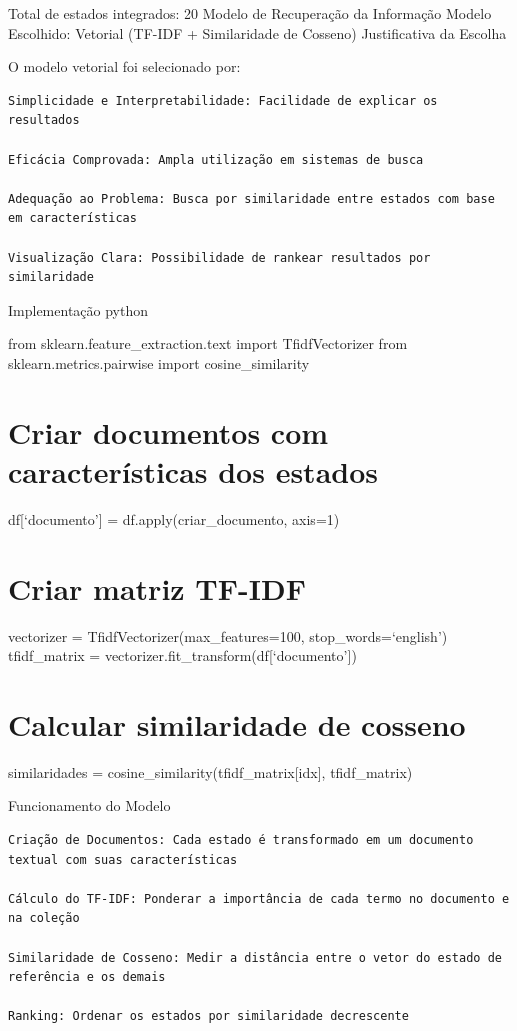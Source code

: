 \documentclass[
  11pt,
  letterpaper,
  DIV=11,
  numbers=noendperiod]{scrartcl}
\begin{document}
Total de estados integrados: 20 Modelo de Recuperação da Informação
Modelo Escolhido: Vetorial (TF-IDF + Similaridade de Cosseno)
Justificativa da Escolha

O modelo vetorial foi selecionado por:

\begin{verbatim}
Simplicidade e Interpretabilidade: Facilidade de explicar os resultados

Eficácia Comprovada: Ampla utilização em sistemas de busca

Adequação ao Problema: Busca por similaridade entre estados com base em características

Visualização Clara: Possibilidade de rankear resultados por similaridade
\end{verbatim}

Implementação python

from sklearn.feature\_extraction.text import TfidfVectorizer from
sklearn.metrics.pairwise import cosine\_similarity

\section{Criar documentos com características dos
estados}\label{criar-documentos-com-caracteruxedsticas-dos-estados}

df{[}`documento'{]} = df.apply(criar\_documento, axis=1)

\section{Criar matriz TF-IDF}\label{criar-matriz-tf-idf}

vectorizer = TfidfVectorizer(max\_features=100, stop\_words=`english')
tfidf\_matrix = vectorizer.fit\_transform(df{[}`documento'{]})

\section{Calcular similaridade de
cosseno}\label{calcular-similaridade-de-cosseno}

similaridades = cosine\_similarity(tfidf\_matrix{[}idx{]},
tfidf\_matrix)

Funcionamento do Modelo

\begin{verbatim}
Criação de Documentos: Cada estado é transformado em um documento textual com suas características

Cálculo do TF-IDF: Ponderar a importância de cada termo no documento e na coleção

Similaridade de Cosseno: Medir a distância entre o vetor do estado de referência e os demais

Ranking: Ordenar os estados por similaridade decrescente
\end{verbatim}
\end{document}
